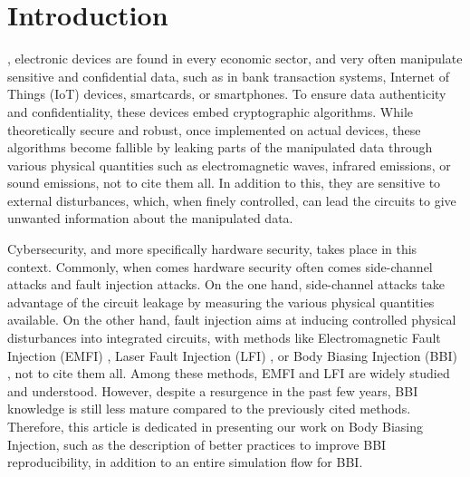 
\section{Introduction}

	, electronic devices are found in every economic sector, and very often manipulate sensitive and confidential data, such as in bank transaction systems, Internet of Things (IoT) devices, smartcards, or smartphones.
	To ensure data authenticity and confidentiality, these devices embed cryptographic algorithms.
	While theoretically secure and robust, once implemented on actual devices, these algorithms become fallible by leaking parts of the manipulated data through various physical quantities such as electromagnetic waves, infrared emissions, or sound emissions, not to cite them all.
	In addition to this, they are sensitive to external disturbances, which, when finely controlled, can lead the circuits to give unwanted information about the manipulated data.

	Cybersecurity, and more specifically hardware security, takes place in this context.
	Commonly, when comes hardware security often comes side-channel attacks and fault injection attacks.
	On the one hand, side-channel attacks take advantage of the circuit leakage by measuring the various physical quantities available.
	On the other hand, fault injection aims at inducing controlled physical disturbances into integrated circuits, with methods like Electromagnetic Fault Injection (EMFI) \cite{mathieuEMFIFirst, mathieuEMFI}, Laser Fault Injection (LFI) \cite{lfiFaultModel}, or Body Biasing Injection (BBI) \cite{bbiOrigin}, not to cite them all.
	Among these methods, EMFI and LFI are widely studied and understood.
	However, despite a resurgence in the past few years, BBI knowledge is still less mature compared to the previously cited methods.
	Therefore, this article is dedicated in presenting our work on Body Biasing Injection, such as the description of better practices to improve BBI reproducibility, in addition to an entire simulation flow for BBI.

